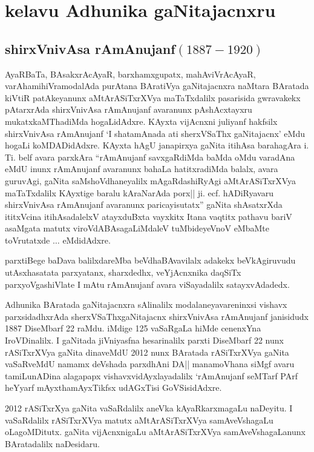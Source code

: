 \chapter{kelavu Adhunika gaNitajacnxru}

\section{{\protect\bf shirxVnivAsa rAmAnujanf$(1887-1920)$}}


AyaRBaTa, BAsakxrAcAyaR, barxhamxgupatx, mahAviVrAcAyaR, varAha\-mihiVra\break modalAda purAtana BAratiVya gaNitajacnxra naMtara BAratada kiVtiR patAkeyanunx aMtA\-rASiTxrXVya maTaTxdalilx pasarisida gwravakekx pAtarxrAda shirxVnivAsa rAmAnujanf avaranunx pAshAcxtayxru mukatxkaMThadiMda hogaLidAdxre. KAyxta vijAcnxni juliyanf hakfsilx shirxVnivAsa rAmAnujanf `I shatamAnada ati sherxVSaThx gaNitajacnx' eMdu hogaLi koMDADidAdxre. KAyxta hAgU janapirxya gaNita itihAsa barahagAra i. Ti. belf avara parxkAra ``rAmAnu\-janf savxgaRdiMda baMda oMdu varadAna eMdU inunx rAmAnujanf avaranunx bahaLa hatitxradiMda balalx, avara guruvAgi, gaNita saMshoVdhaneyalilx mAgaRdashiRyAgi aMtArASiTxrXVya maTaTxdalilx KAyxtige baralu kAraNarAda porx|| ji. ecf. hADiRyavaru shirxVnivAsa rAmAnujanf avaranunx paricayisutatx'' gaNita shAsatxrXda ititxVcina itihAsadalelxV atayxduBxta vayxkitx Itana vaqtitx pathavu bariV asaMgata matutx viroVdA\-BAsagaLiMdaleV tuMbideyeVnoV eMbaMte toVrutatxde $\ldots$ eMdidAdxre.

parxtiBege baDava balilxdareMba beVdhaBAvavilalx adakekx beVkAgiruvudu utAsxha\break satata parxyatanx, sharxdedhx, veYjAcnxnika daqSiTx parxyoVgashiVlate I mAtu rAmAnujanf avara viSayadalilx satayxvAdadedx.

Adhunika BAratada gaNitajacnxra sAlinalilx modalaneyavareninxsi vishavx parxsidadhxrAda sherxVSaThxgaNitajacnx shirxVnivAsa rAmAnujanf janisidudx {\rm 1887} DiseMbarf {\rm 22} raMdu. iMdige {\rm 125} vaSaRgaLa hiMde cenenxYna IroVDinalilx. I gaNitada jiVniyasfna hesarinalilx parxti DiseM\-barf {\rm 22} nunx rASiTxrXVya gaNita dinaveMdU {\rm 2012} nunx BAratada rASiTxrXVya gaNita vaSaR\-veMdU namamx deVshada parxdhAni DA|| manamoVhana siMgf avaru tamiLunADina alagapapx vishavxvidAyxlayadalilx `rAmAnujanf seMTarf PArf heYyarf mAyxthamAyxTikfsx udAGxTisi GoVSisidAdxre.

{\rm 2012} rASiTxrXya gaNita vaSaRdalilx aneVka kAyaRkarxmagaLu naDeyitu. I vaSaRdalilx rASiTxrXVya matutx aMtArASiTxrXVya samAveVshagaLu oLagoMDitutx. gaNita vijAcnxnigaLu aMtArASiTxrXVya samAveVshagaLanunx BAratadalilx naDesidaru.

